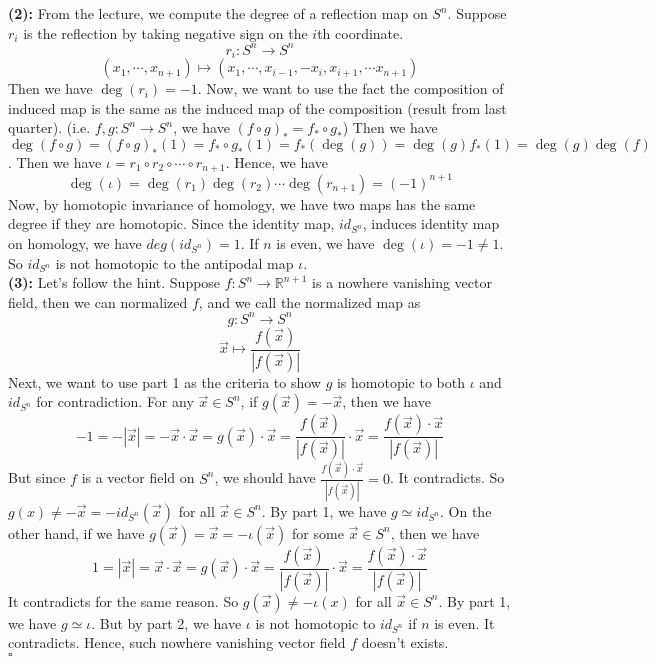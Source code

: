 \documentclass[12pt]{amsart}
\newcommand{\R}{\mathbb{R}}
\begin{document}
\textbf{(2):} From the lecture, we compute the degree of a reflection map on $S^n$. Suppose $r_i$ is the reflection by taking negative sign on the $i$th coordinate. 
\[r_i:S^n\to S^n\]
\[(x_1,\cdots,x_{n+1})\mapsto (x_1,\cdots, x_{i-1},-x_{i},x_{i+1},\cdots x_{n+1})\] 
Then we have $\deg(r_i)=-1$. Now, we want to use the fact the composition of induced map is the same as the induced map of the composition (result from last quarter). (i.e. $f,g:S^n\to S^n$, we have $(f\circ g)_\ast=f_\ast\circ g_\ast$) Then we have $\deg(f\circ g)=(f\circ g)_\ast(1)=f_\ast\circ g_\ast(1)=f_\ast(\deg(g))=\deg(g)f_\ast(1)=\deg(g)\deg(f)$. Then we have $\iota=r_1\circ r_2\circ \cdots \circ r_{n+1}$. Hence, we have 
\[\deg(\iota)=\deg(r_1)\deg(r_2)\cdots \deg(r_{n+1})=(-1)^{n+1}\]
Now, by homotopic invariance of homology, we have two maps has the same degree if they are homotopic. Since the identity map, $id_{S^n}$, induces identity map on homology, we have $deg(id_{S^n})=1$. If $n$ is even, we have $\deg(\iota)=-1\neq 1$. So $id_{S^n}$ is not homotopic to the antipodal map $\iota$.\\
\textbf{(3):} Let's follow the hint. Suppose $f:S^n\to \R^{n+1}$ is a nowhere vanishing vector field, then we can normalized $f$, and we call the normalized map as 
\[g:S^n\to S^n\]
\[\vec{x}\mapsto \frac{f(\vec{x})}{|f(\vec{x})|}\]
Next, we want to use part 1 as the criteria to show $g$ is homotopic to both $\iota$ and $id_{S^n}$ for contradiction. For any $\vec{x}\in S^n$, if $g(\vec{x})=-\vec{x}$, then we have 
\[-1=-|\vec{x}|=-\vec{x}\cdot \vec{x}=g(\vec{x})\cdot \vec{x}=\frac{f(\vec{x})}{|f(\vec{x})|}\cdot \vec{x}=\frac{f(\vec{x})\cdot \vec{x}}{|f(\vec{x})|}\]
But since $f$ is a vector field on $S^n$, we should have $\frac{f(\vec{x})\cdot \vec{x}}{|f(\vec{x})|}=0$. It contradicts. So $g(x)\neq -\vec{x}=-id_{S^n}(\vec{x})$ for all $\vec{x}\in S^n$. By part 1, we have $g\simeq id_{S^n}$. On the other hand, if we have $g(\vec{x})=\vec{x}=-\iota(\vec{x})$ for some $\vec{x}\in S^n$, then we have 
\[1=|\vec{x}|=\vec{x}\cdot \vec{x}=g(\vec{x})\cdot \vec{x}=\frac{f(\vec{x})}{|f(\vec{x})|}\cdot \vec{x}=\frac{f(\vec{x})\cdot \vec{x}}{|f(\vec{x})|}\]
It contradicts for the same reason. So $g(\vec{x})\neq -\iota(x)$ for all $\vec{x}\in S^n$. By part 1, we have $g\simeq \iota$. But by part 2, we have $\iota$ is not homotopic to $id_{S^n}$ if $n$ is even. It contradicts. Hence, such nowhere vanishing vector field $f$ doesn't exists.
\\\phantom{qed}\hfill$\square$\\
\end{document}
